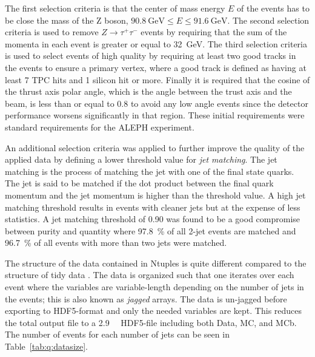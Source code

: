 The first selection criteria is that the center of mass energy $E$ of the events has to be close the mass of the Z boson, ${\SI{90.8}{\GeV} \leq E \leq \SI{91.6}{\GeV}}$. The second selection criteria is used to remove ${Z \rightarrow \tau^+ \tau^-}$ events by requiring that the sum of the momenta in each event is greater or equal to \SI{32}{\GeV}. The third selection criteria is used to select events of high quality by requiring at least two good tracks in the events to ensure a primary vertex, where a good track is defined as having at least \num{7} TPC hits and \num{1} silicon hit or more. Finally it is required that the cosine of the thrust axis polar angle, which is the angle between the trust axis and the beam, is less than or equal to \num{0.8} to avoid any low angle events since the detector performance worsens significantly in that region. These initial requirements were standard requirements for the ALEPH experiment.

An additional selection criteria was applied to further improve the quality of the applied data by defining a lower threshold value for \emph{jet matching}. The jet matching is the process of matching the jet with one of the final state quarks. The jet is said to be matched if the dot product between the final quark momentum and the jet momentum is higher than the threshold value. A high jet matching threshold results in events with cleaner jets but at the expense of less statistics. A jet matching threshold of \num{0.90} was found to be a good compromise between purity and quantity where \SI{97.8}{\percent} of all 2-jet events are matched and \SI{96.7}{\percent} of all events with more than two jets were matched.  

The structure of the data contained in Ntuples is quite different compared to the   structure of tidy data \autocite{JSSv059i10}. The data is organized such that one iterates over each event where the variables are variable-length depending on the number of jets in the events; this is also known as \emph{jagged} arrays. The data is un-jagged before exporting to HDF5-format and only the needed variables are kept. This reduces the total output file to a \SI{2.9}{\giga\byte} HDF5-file including both Data, MC, and MCb. The number of events for each number of jets can be seen in Table~\ref{tab:q:datasize}.

